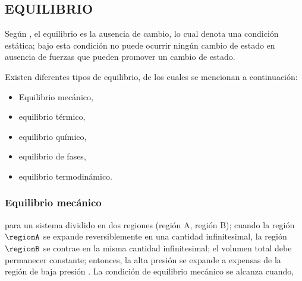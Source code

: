 

\subsection{EQUILIBRIO}
  Según \parencite[p. 29]{bib:thermo:VanNess}, el equilibrio es la ausencia de cambio, lo cual denota una condición estática; bajo esta condición no puede ocurrir ningún cambio de estado en ausencia de fuerzas que pueden promover un cambio de estado.

  Existen diferentes tipos de equilibrio, de los cuales se mencionan a continuación:
  \begin{itemize}
    \item Equilibrio mecánico,
    \item equilibrio térmico,
    \item equilibrio químico,
    \item equilibrio de fases,
    \item equilibrio termodinámico.
  \end{itemize}

\subsubsection{Equilibrio mecánico} 
  para un sistema dividido en dos regiones (región A, región B); cuando la región $\regionA$ se expande reversiblemente en una cantidad infinitesimal, la región $\regionB$ se contrae en la misma cantidad infinitesimal; el volumen total debe permanecer constante; entonces, la alta presión se expande a expensas de la región de baja presión \parencite[p.~226]{bib:castellan1998fisicoquimica}. La condición de equilibrio mecánico se alcanza cuando,


